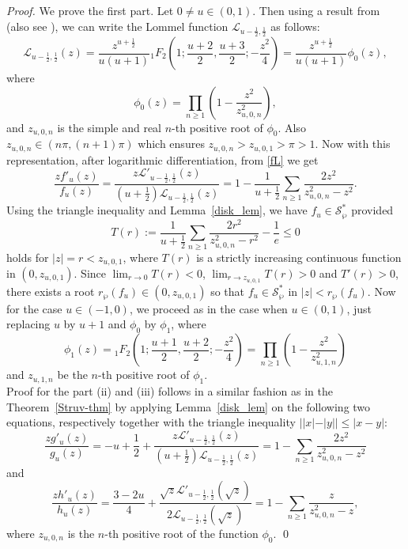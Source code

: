 \documentclass[12pt, reqno]{amsart}
\numberwithin{equation}{section}
\theoremstyle{plain}
\theoremstyle{definition}
\theoremstyle{remark}
\begin{document}
\begin{proof}
	We prove the first part. Let $0\neq u\in(0,1)$. Then using a result from \cite{lommel-hadmrd} (also see \cite[Lemma 1, p.~3358]{bdoy-2016}), we can write the Lommel function $\mathcal{L}_{u-\tfrac{1}{2},\tfrac{1}{2}}$ as follows:
	\begin{equation}
	\mathcal{L}_{u-\tfrac{1}{2},\tfrac{1}{2}}(z)=\frac{z^{u+\tfrac{1}{2}}}{u(u+1)}{}_1F_2\left(1;\frac{u+2}{2},\frac{u+3}{2};-\frac{z^2}{4}\right)=\frac{z^{u+\tfrac{1}{2}}}{u(u+1)}\phi_{0}(z),
	\end{equation}
	where $$\phi_{0}(z)=\prod_{n\geq1}\left(1-\frac{z^2}{z^2_{u,0,n}}\right),$$
	and $z_{u,0,n}$ is the simple and real $n$-th positive root of $\phi_{0}$. Also $z_{u,0,n}\in (n\pi, (n+1)\pi)$ which ensures $z_{u,0,n}>z_{u,0,1}>\pi>1$. Now with this representation, after logarithmic differentiation, from \eqref{fL} we get
	\begin{equation*}
	\frac{zf'_{u}(z)}{f_{u}(z)}=\frac{z\mathcal{L}'_{u-\tfrac{1}{2},\tfrac{1}{2}}(z)}{(u+\tfrac{1}{2})\mathcal{L}_{u-\tfrac{1}{2},\tfrac{1}{2}}(z)}=1-\frac{1}{u+\tfrac{1}{2}}\sum_{n\geq1}\frac{2z^2}{z^2_{u,0,n}-z^2}.
	\end{equation*}
	Using the triangle inequality and Lemma~\ref{disk_lem}, we have $f_{u}\in \mathcal{S}^*_{\wp}$ provided 
	$$T(r):=\frac{1}{u+\tfrac{1}{2}}\sum_{n\geq1}\frac{2r^2}{z^2_{u,0,n}-r^2}-\frac{1}{e}\leq0$$
	holds for $|z|=r<z_{u,0,1}$, where $T(r)$ is a strictly increasing continuous function in $(0,z_{u,0,1})$. Since $\lim_{r\rightarrow0}T(r)<0$, $\lim_{r\rightarrow z_{u,0,1}}T(r)>0$ and $T'(r)>0$,  there exists a root $r_{\wp}(f_{u})\in(0,z_{u,0,1})$ so that $f_{u}\in \mathcal{S}^*_{\wp}$ in $|z|<r_{\wp}(f_{u})$. Now for the case $u\in (-1,0)$, we proceed as in the case when $u\in(0,1)$, just replacing $u$ by $u+1$ and $\phi_{0}$ by $\phi_{1}$, where
	$$\phi_{1}(z)={}_1F_2\left(1;\frac{u+1}{2},\frac{u+2}{2};-\frac{z^2}{4}\right)=\prod_{n\geq1}\left(1-\frac{z^2}{z^2_{u,1,n}}\right)$$
	and $z_{u,1,n}$ be the $n$-th positive root of $\phi_1$.\\
	Proof for the part (ii) and (iii)  follows in a similar fashion as in the Theorem~\ref{Struv-thm} by applying Lemma~\ref{disk_lem} on the following two equations, respectively together with the triangle inequality $||x|-|y||\leq|x-y|$:
	\begin{equation*}
	\frac{zg'_{u}(z)}{g_{u}(z)}=-u+\frac{1}{2}+\frac{z\mathcal{L}'_{u-\tfrac{1}{2},\tfrac{1}{2}}(z)}{(u+\tfrac{1}{2})\mathcal{L}_{u-\tfrac{1}{2},\tfrac{1}{2}}(z)}=1-\sum_{n\geq1}\frac{2z^2}{z^2_{u,0,n}-z^2}
	\end{equation*}
	and 
	\begin{equation*}
	\frac{zh'_{u}(z)}{h_{u}(z)}=\frac{3-2u}{4}+\frac{\sqrt{z}\mathcal{L}'_{u-\tfrac{1}{2},\tfrac{1}{2}}(\sqrt{z})}{2\mathcal{L}_{u-\tfrac{1}{2},\tfrac{1}{2}}(\sqrt{z})}=1-\sum_{n\geq1}\frac{z}{z^2_{u,0,n}-z},
	\end{equation*}
	where $z_{u,0,n}$ is the $n$-th positive root of the function $\phi_0$. \qed
\end{proof}	
\end{document}
